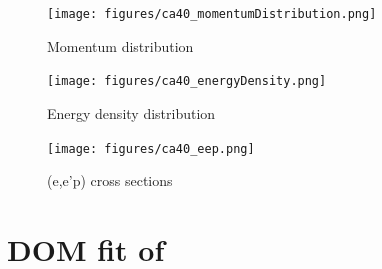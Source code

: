 \begin{figure}[H]
    \centering
    \texttt{[image: figures/ca40\_momentumDistribution.png]}
    \caption{Momentum distribution}
    \label{DOMFitData_ca40_momentumDistribution}
\end{figure}

\begin{figure}[H]
    \centering
    \texttt{[image: figures/ca40\_energyDensity.png]}
    \caption{Energy density distribution}
    \label{DOMFitData_ca40_energyDensity}
\end{figure}

\begin{figure}[H]
    \centering
    \texttt{[image: figures/ca40\_eep.png]}
    \caption{(e,e'p) cross sections}
    \label{DOMFitData_ca40_eep}
\end{figure}


\section{DOM fit of \caEight}

